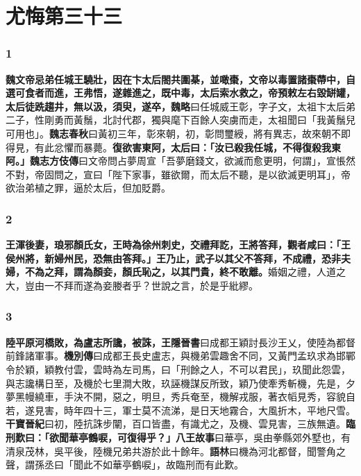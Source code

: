 \chapter{尤悔第三十三}

\subsection*{1}

\textbf{魏文帝忌弟任城王驍壯，因在卞太后閤共圍棊，並噉棗，文帝以毒置諸棗蔕中，自選可食者而進，王弗悟，遂雜進之，既中毒，太后索水救之，帝預敕左右毀缾罐，太后徒跣趨井，無以汲，須臾，遂卒，}{\footnotesize \textbf{魏略}曰任城威王彰，字子文，太祖卞太后弟二子，性剛勇而黃鬚，北討代郡，獨與麾下百餘人突虜而走，太祖聞曰「我黃鬚兒可用也」。\textbf{魏志春秋}曰黃初三年，彰來朝，初，彰問璽綬，將有異志，故來朝不即得見，有此忿懼而暴薨。}\textbf{復欲害東阿，太后曰：「汝已殺我任城，不得復殺我東阿。」}{\footnotesize \textbf{魏志方伎傳}曰文帝問占夢周宣「吾夢磨錢文，欲滅而愈更明，何謂」，宣悵然不對，帝固問之，宣曰「陛下家事，雖欲爾，而太后不聽，是以欲滅更明耳」，帝欲治弟植之罪，逼於太后，但加貶爵。}

\subsection*{2}

\textbf{王渾後妻，琅邪顏氏女，王時為徐州刺史，交禮拜訖，王將答拜，觀者咸曰：「王侯州將，新婦州民，恐無由答拜。」王乃止，武子以其父不答拜，不成禮，恐非夫婦，不為之拜，謂為顏妾，顏氏恥之，以其門貴，終不敢離。}{\footnotesize 婚姻之禮，人道之大，豈由一不拜而遂為妾媵者乎？世說之言，於是乎紕繆。}

\subsection*{3}

\textbf{陸平原河橋敗，為盧志所讒，被誅，}{\footnotesize \textbf{王隱晉書}曰成都王穎討長沙王乂，使陸為都督前鋒諸軍事。\textbf{機別傳}曰成都王長史盧志，與機弟雲趣舍不同，又黃門孟玖求為邯鄲令於穎，穎教付雲，雲時為左司馬，曰「刑餘之人，不可以君民」，玖聞此怨雲，與志讒構日至，及機於七里澗大敗，玖誣機謀反所致，穎乃使牽秀斬機，先是，夕夢黑幔繞車，手決不開，惡之，明旦，秀兵奄至，機解戎服，著衣幍見秀，容貌自若，遂見害，時年四十三，軍士莫不流涕，是日天地霧合，大風折木，平地尺雪。\textbf{干寶晉紀}曰初，陸抗誅步闡，百口皆盡，有識尤之，及機、雲見害，三族無遺。}\textbf{臨刑歎曰：「欲聞華亭鶴唳，可復得乎？」}{\footnotesize \textbf{八王故事}曰華亭，吳由拳縣郊外墅也，有清泉茂林，吳平後，陸機兄弟共游於此十餘年。\textbf{語林}曰機為河北都督，聞警角之聲，謂孫丞曰「聞此不如華亭鶴唳」，故臨刑而有此歎。}

